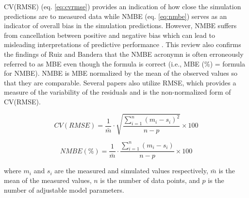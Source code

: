\documentclass[review]{elsarticle}
\begin{document}
\begin{table}[h!]
\caption{Error limits specified by various guidelines and protocols for a building energy simulation model to be deemed calibrated.} 
\label{tab:error_limits}
\centering
{}
\end{table}

CV(RMSE) (eq. \ref{eq:cvrmse}) provides an indication of how close the simulation predictions are to measured data while NMBE (eq. \ref{eq:nmbe}) serves as an indicator of overall bias in the simulation predictions. However, NMBE suffers from cancellation between positive and negative bias which can lead to misleading interpretations of predictive performance \cite{chakraborty2017performance}. This review also confirms the findings of Ruiz and Bandera \cite{ruiz2017validation} that the NMBE acronymn is often erroneously referred to as MBE even though the formula is correct (i.e., MBE (\%) = formula for NMBE). NMBE is MBE normalized by the mean of the observed values so that they are comparable. Several papers also utilize RMSE, which provides a measure of the variability of the residuals and is the non-normalized form of CV(RMSE).

\begin{equation}\label{eq:cvrmse}
CV(RMSE) = \frac{1}{\bar{m}}\cdot \sqrt{\frac{\sum_{i=1}^n (m_i - s_i)^2}{n-p}} \times 100
\end{equation}

\begin{equation}
\label{eq:nmbe}
    NMBE (\%) = \frac{1}{\bar{m}}\cdot\frac{\sum_{i=1}^n (m_i - s_i)}{n-p} \times 100
\end{equation}

\noindent where $m_i$ and $s_i$ are the measured and simulated values respectively, $\bar{m}$ is the mean of the measured values, $n$ is the number of data points, and $p$ is the number of adjustable model parameters.
\end{document}

